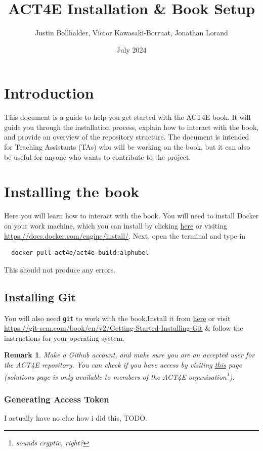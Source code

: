 \documentclass{article}
\title{ACT4E Installation \& Book Setup}
\author{ Justin Bollhalder, Victor Kawasaki-Borruat, Jonathan Lorand}
\date{July 2024}
\newtheorem{remark}{Remark}
\begin{document}
\maketitle

\section{Introduction}
This document is a guide to help you get started with the ACT4E book. It will guide you through the installation process, explain how to interact with the book, and provide an overview of the repository structure. The document is intended for Teaching Assistants (TAs) who will be working on the book, but it can also be useful for anyone who wants to contribute to the project.

\section{Installing the book}
Here you will learn how to interact with the book. You will need to install Docker on your work machine, which you can install by clicking  \href{https://docs.docker.com/engine/install/}{here} or visiting \url{https://docs.docker.com/engine/install/}. Next, open the terminal and type in
\begin{verbatim}
  docker pull act4e/act4e-build:alphubel
\end{verbatim}
This should not produce any errors.


\subsection{Installing Git}
You will also need \texttt{git} to work with the book.Install it from \href{https://git-scm.com/book/en/v2/Getting-Started-Installing-Git}{here} or visit \url{https://git-scm.com/book/en/v2/Getting-Started-Installing-Git} \& follow the instructions for your operating system.

\begin{remark}
    Make a Github account, and make sure you are an accepted user for the ACT4E repository. You can check if you have access by visiting \href{https://github.com/ACT4E/ACT4E-solutions}{this} page (solutions page is only available to members of the ACT4E organisation\footnote{sounds cryptic, right?}).
\end{remark}

\subsubsection{Generating Access Token}
I actually have no clue how i did this, TODO.
\end{document}
